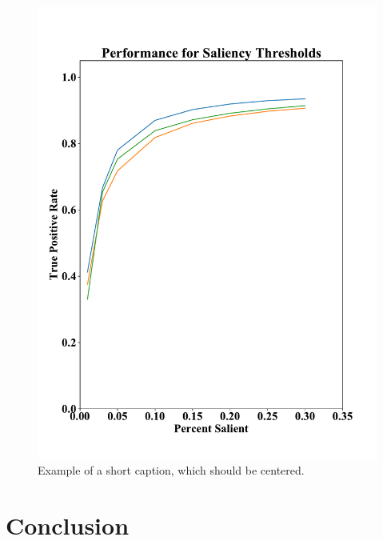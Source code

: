 \documentclass[10pt,twocolumn,letterpaper]{article}
\begin{document}
\begin{figure}
\begin{center}
\includegraphics[width=\columnwidth]{figures/tpr.pdf}

\end{center}
   \caption{Example of a short caption, which should be centered.}
\label{fig:short}
\end{figure}

\section{Conclusion}

{\small


}
\end{document}
